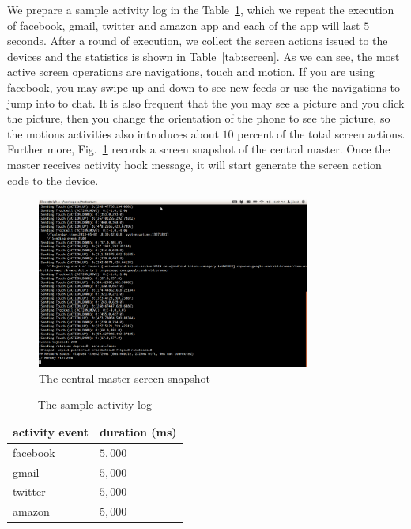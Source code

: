 We prepare a sample activity log in the Table~\ref{tab:log}, which we repeat the execution of facebook, gmail, twitter and amazon app and each of the app will last $5$ seconds. After a round of execution, we collect the screen actions issued to the devices and the statistics is shown in Table~\ref{tab:screen}. As we can see, the most active screen operations are navigations, touch and motion. If you are using facebook, you may swipe up and down to see new feeds or use the navigations to jump into to chat. It is also frequent that the you may see a picture and you click the picture, then you change the orientation of the phone to see the picture, so the motions activities also introduces about $10$ percent of the total screen actions. Further more, Fig.~\ref{fig:master} records a screen snapshot of the central master. Once the master receives activity hook message, it will start generate the screen action code to the device.

\begin{figure}
\centering
\includegraphics[width=0.8\textwidth]{figures/master.png}
\caption{The central master screen snapshot}
\label{fig:master}
\end{figure}

\begin{table}
\centering
\caption{The sample activity log}
\begin{tabular}{ll}\toprule
activity event & duration (ms) \\\midrule
facebook & $5,000$ \\
gmail & $5,000$ \\
twitter & $5,000$ \\
amazon & $5,000$\\\bottomrule
\end{tabular}
\label{tab:log}
\end{table}

